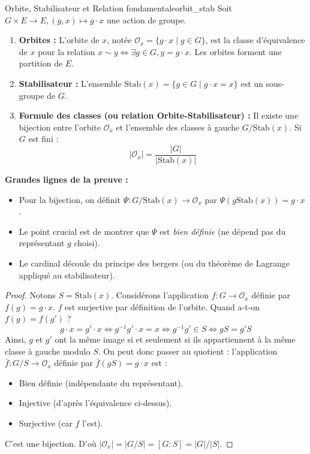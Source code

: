 \documentclass{prepacours}
\begin{document}
\begin{proposition}{Orbite, Stabilisateur et Relation fondamentale}{orbit_stab}
    Soit $G \times E \to E, (g, x) \mapsto g \cdot x$ une action de groupe.
    \begin{enumerate}
        \item \textbf{Orbites :} L'orbite de $x$, notée $\mathcal{O}_x = \{g \cdot x \mid g \in G\}$, est la classe d'équivalence de $x$ pour la relation $x \sim y \iff \exists g \in G, y = g \cdot x$. Les orbites forment une partition de $E$.
        \item \textbf{Stabilisateur :} L'ensemble $\text{Stab}(x) = \{g \in G \mid g \cdot x = x\}$ est un sous-groupe de $G$.
        \item \textbf{Formule des classes (ou relation Orbite-Stabilisateur) :} Il existe une bijection entre l'orbite $\mathcal{O}_x$ et l'ensemble des classes à gauche $G/\text{Stab}(x)$. Si $G$ est fini :
        \[ |\mathcal{O}_x| = \frac{|G|}{|\text{Stab}(x)|} \]
    \end{enumerate}
\end{proposition}

\noindent \textbf{Grandes lignes de la preuve :}
\begin{itemize}
    \item Pour la bijection, on définit $\Psi : G/\text{Stab}(x) \to \mathcal{O}_x$ par $\Psi(g \text{Stab}(x)) = g \cdot x$.
    \item Le point crucial est de montrer que $\Psi$ est \textit{bien définie} (ne dépend pas du représentant $g$ choisi).
    \item Le cardinal découle du principe des bergers (ou du théorème de Lagrange appliqué au stabilisateur).
\end{itemize}

\begin{proof}
    Notons $S = \text{Stab}(x)$.
    Considérons l'application $f : G \to \mathcal{O}_x$ définie par $f(g) = g \cdot x$. $f$ est surjective par définition de l'orbite.
    Quand a-t-on $f(g) = f(g')$ ?
    \[ g \cdot x = g' \cdot x \iff g^{-1}g' \cdot x = x \iff g^{-1}g' \in S \iff gS = g'S \]
    Ainsi, $g$ et $g'$ ont la même image si et seulement si ils appartiennent à la même classe à gauche modulo $S$.
    On peut donc passer au quotient : l'application $\bar{f} : G/S \to \mathcal{O}_x$ définie par $\bar{f}(gS) = g \cdot x$ est :
    \begin{itemize}
        \item Bien définie (indépendante du représentant).
        \item Injective (d'après l'équivalence ci-dessus).
        \item Surjective (car $f$ l'est).
    \end{itemize}
    C'est une bijection. D'où $|\mathcal{O}_x| = |G/S| = [G:S] = |G|/|S|$.
\end{proof}
\end{document}
